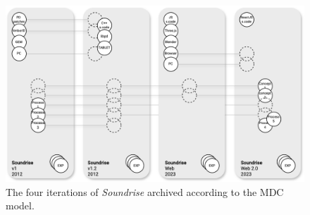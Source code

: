\begin{figure}[!h]
    \includegraphics[width=\linewidth]{chapters/appendix/d/image/graphd-mdc.png}
    \caption{The four iterations of \textit{Soundrise} archived according to the MDC model.}
    \label{fig:ab-graph_mdc}
\end{figure}















